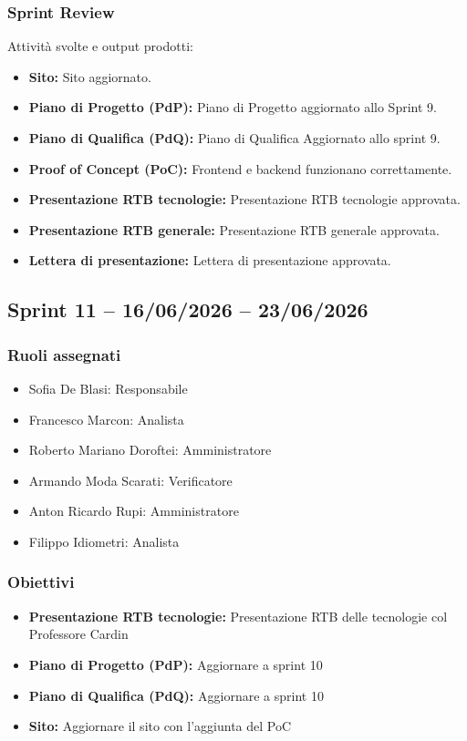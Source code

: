 \subsubsection{Sprint Review}
Attività svolte e output prodotti:
\begin{itemize}
    \item \textbf{Sito:} Sito aggiornato.
    \item \textbf{Piano di Progetto (PdP):} Piano di Progetto aggiornato allo Sprint 9.
    \item \textbf{Piano di Qualifica (PdQ):} Piano di Qualifica Aggiornato allo sprint 9.
    \item \textbf{Proof of Concept (PoC):} Frontend e backend funzionano correttamente.
    \item \textbf{Presentazione RTB tecnologie:} Presentazione RTB tecnologie approvata.
    \item \textbf{Presentazione RTB generale:} Presentazione RTB generale approvata.
    \item \textbf{Lettera di presentazione:} Lettera di presentazione approvata.
\end{itemize}

\subsection{Sprint 11 -- 16/06/2026 -- 23/06/2026}
\label{sec:sprint11}

\subsubsection{Ruoli assegnati}
\begin{itemize}
    \item Sofia De Blasi: Responsabile
    \item Francesco Marcon: Analista
    \item Roberto Mariano Doroftei: Amministratore
    \item Armando Moda Scarati: Verificatore
    \item Anton Ricardo Rupi: Amministratore
    \item Filippo Idiometri: Analista
\end{itemize}

\subsubsection{Obiettivi}
\begin{itemize}
    \item \textbf{Presentazione RTB tecnologie:} Presentazione RTB delle tecnologie col Professore Cardin
    \item \textbf{Piano di Progetto (PdP):} Aggiornare a sprint 10
    \item \textbf{Piano di Qualifica (PdQ):} Aggiornare a sprint 10
    \item \textbf{Sito:} Aggiornare il sito con l'aggiunta del PoC
\end{itemize}

